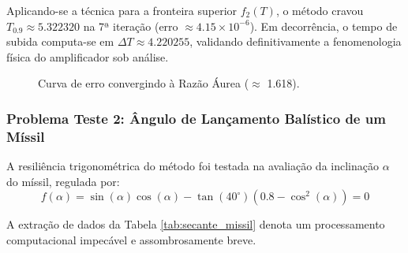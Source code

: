 Aplicando-se a técnica para a fronteira superior $f_2(T)$, o método cravou $T_{0.9} \approx 5.322320$ na 7ª iteração (erro $\approx 4.15 \times 10^{-6}$). Em decorrência, o tempo de subida computa-se em $\Delta T \approx 4.220255$, validando definitivamente a fenomenologia física do amplificador sob análise.

\begin{figure}[H]
    \centering
    \caption{Curva de erro convergindo à Razão Áurea ($\approx$ 1.618).}
    \label{fig:convergencia_secante_amplificador}
\end{figure}

\subsubsection{Problema Teste 2: Ângulo de Lançamento Balístico de um Míssil}
\label{subsubsec:problema_teste_2_secante}

A resiliência trigonométrica do método foi testada na avaliação da inclinação $\alpha$ do míssil, regulada por:
\begin{equation}
    f(\alpha) = \sin(\alpha)\cos(\alpha) - \tan(40^\circ)\left(0.8 - \cos^2(\alpha)\right) = 0
\end{equation}

A extração de dados da Tabela \ref{tab:secante_missil} denota um processamento computacional impecável e assombrosamente breve.

